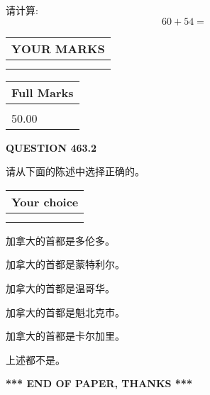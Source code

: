 \documentclass{ctexart}
\begin{document}
  
 
请计算:
\begin{equation}
60 +  %
54 = \nonumber
\end{equation}
 

 

 
  
\vspace{0.2in}
  
\noindent\begin{tabular}{|l|}
\hline
 YOUR MARKS  \\
\hline
 \\ 
 \\ 
\hline
\end{tabular}
\hspace{0.05in} \begin{tabular}{|l|}
\hline
 Full Marks  \\
\hline
 \\ 
50.00 \\
\hline
\end{tabular}
{\textbf{\Large{QUESTION
463.2 
}}}
  
  
请从下面的陈述中选择正确的。
  
  
\noindent\hspace{3.0in} \begin{tabular}{|l|}
\hline
Your choice \\
\hline
 \\ 
 \\ 
\hline
\end{tabular}
  
  
 
 
加拿大的首都是多伦多。
 
 
加拿大的首都是蒙特利尔。
 
 
加拿大的首都是温哥华。
 
 
加拿大的首都是魁北克市。
 
 
加拿大的首都是卡尔加里。
 
 
 上述都不是。
 
 
   
   
 \vspace{0.2in}
 
   
   
   
   
\vspace{1.0in} 
{\textbf{\large{ *** END OF PAPER, THANKS *** }}} 
   
\end{document}
